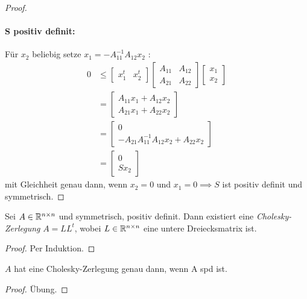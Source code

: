 \begin{proof}
\paragraph{S positiv definit:}
Für $x_2$ beliebig setze $x_1=-A_{11}^{-1}A_{12}x_2$ :
\begin{align*}
	0&\le \begin{bmatrix}
	x_1^{t} & x_2^{t} 
\end{bmatrix}
\begin{bmatrix}
	A_{11} & A_{12} \\
	A_{21} & A_{22}
\end{bmatrix} \begin{bmatrix}
x_1 \\ x_2
\end{bmatrix} \\
	 &= \begin{bmatrix}
	 A_{11}x_1 + A_{12}x_2 \\
	 A_{21}x_1+A_{22}x_2
	 \end{bmatrix} \\
	 &= \begin{bmatrix}
	 0 \\ -A_{21}A_{11}^{-1}A_{12}x_2+A_{22}x_2
	 \end{bmatrix} \\
	 &= \begin{bmatrix}
	 0 \\ Sx_2
	 \end{bmatrix}
\end{align*}
mit Gleichheit genau dann, wenn $x_2=0$ und $x_1=0 \implies S$  ist positiv definit und symmetrisch.
\end{proof}
\begin{theorem}
	Sei $A \in  \mathbb{R}^{n\times n}$ und symmetrisch, positiv definit. Dann existiert eine \emph{Cholesky-Zerlegung} $A=LL^{t}$, wobei $L \in \mathbb{R}^{n\times n}$   eine untere Dreiecksmatrix ist.
\end{theorem}
\begin{proof}
Per Induktion.

\end{proof}
\begin{corollary}
	$A$ hat eine Cholesky-Zerlegung genau dann, wenn A spd ist.
\end{corollary}
\begin{proof}
Übung.
\end{proof}
